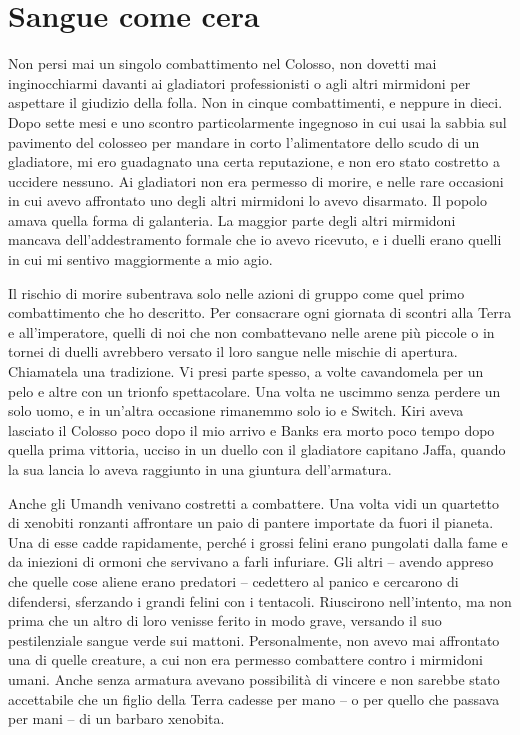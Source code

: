 \chapter{Sangue come cera}

Non persi mai un singolo combattimento nel Colosso, non dovetti mai
inginocchiarmi davanti ai gladiatori professionisti o agli altri
mirmidoni per aspettare il giudizio della folla. Non in cinque
combattimenti, e neppure in dieci. Dopo sette mesi e uno scontro
particolarmente ingegnoso in cui usai la sabbia sul pavimento del
colosseo per mandare in corto l'alimentatore dello scudo di un
gladiatore, mi ero guadagnato una certa reputazione, e non ero stato
costretto a uccidere nessuno. Ai gladiatori non era permesso di morire,
e nelle rare occasioni in cui avevo affrontato uno degli altri mirmidoni
lo avevo disarmato. Il popolo amava quella forma di galanteria. La
maggior parte degli altri mirmidoni mancava dell'addestramento formale
che io avevo ricevuto, e i duelli erano quelli in cui mi sentivo
maggiormente a mio agio.

Il rischio di morire subentrava solo nelle azioni di gruppo come quel
primo combattimento che ho descritto. Per consacrare ogni giornata di
scontri alla Terra e all'imperatore, quelli di noi che non combattevano
nelle arene più piccole o in tornei di duelli avrebbero versato il loro
sangue nelle mischie di apertura. Chiamatela una tradizione. Vi presi
parte spesso, a volte cavandomela per un pelo e altre con un trionfo
spettacolare. Una volta ne uscimmo senza perdere un solo uomo, e in
un'altra occasione rimanemmo solo io e Switch. Kiri aveva lasciato il
Colosso poco dopo il mio arrivo e Banks era morto poco tempo dopo quella
prima vittoria, ucciso in un duello con il gladiatore capitano Jaffa,
quando la sua lancia lo aveva raggiunto in una giuntura dell'armatura.

Anche gli Umandh venivano costretti a combattere. Una volta vidi un
quartetto di xenobiti ronzanti affrontare un paio di pantere importate
da fuori il pianeta. Una di esse cadde rapidamente, perché i grossi
felini erano pungolati dalla fame e da iniezioni di ormoni che servivano
a farli infuriare. Gli altri -- avendo appreso che quelle cose aliene
erano predatori -- cedettero al panico e cercarono di difendersi,
sferzando i grandi felini con i tentacoli. Riuscirono nell'intento, ma
non prima che un altro di loro venisse ferito in modo grave, versando il
suo pestilenziale sangue verde sui mattoni. Personalmente, non avevo mai
affrontato una di quelle creature, a cui non era permesso combattere
contro i mirmidoni umani. Anche senza armatura avevano possibilità di
vincere e non sarebbe stato accettabile che un figlio della Terra
cadesse per mano -- o per quello che passava per mani -- di un barbaro
xenobita.

